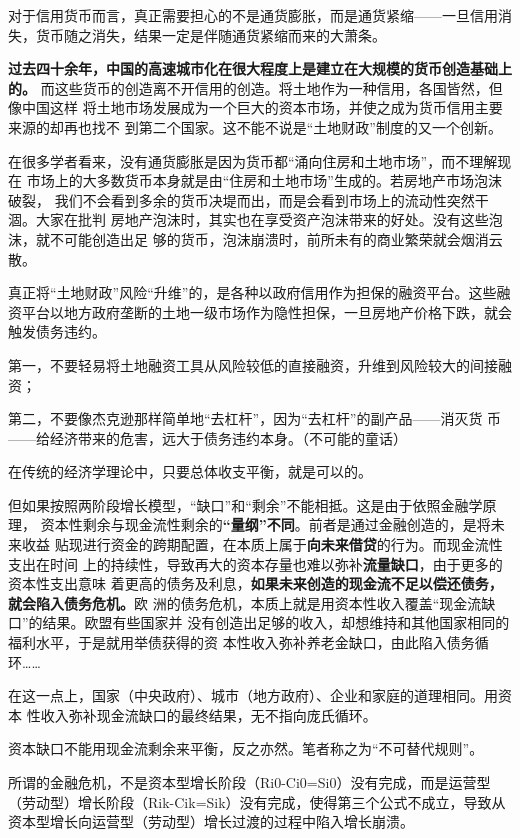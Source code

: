 对于信用货币而言，真正需要担心的不是通货膨胀，而是通货紧缩——一旦信用消失，货币随之消失，结果一定是伴随通货紧缩而来的大萧条。

\textbf{过去四十余年，中国的高速城市化在很大程度上是建立在大规模的货币创造基础上的。}
而这些货币的创造离不开信用的创造。将土地作为一种信用，各国皆然，但像中国这样
将土地市场发展成为一个巨大的资本市场，并使之成为货币信用主要来源的却再也找不
到第二个国家。这不能不说是“土地财政”制度的又一个创新。

在很多学者看来，没有通货膨胀是因为货币都“涌向住房和土地市场”，而不理解现在
市场上的大多数货币本身就是由“住房和土地市场”生成的。若房地产市场泡沫破裂，
我们不会看到多余的货币决堤而出，而是会看到市场上的流动性突然干涸。大家在批判
房地产泡沫时，其实也在享受资产泡沫带来的好处。没有这些泡沫，就不可能创造出足
够的货币，泡沫崩溃时，前所未有的商业繁荣就会烟消云散。


真正将“土地财政”风险“升维”的，是各种以政府信用作为担保的融资平台。这些融资平台以地方政府垄断的土地一级市场作为隐性担保，一旦房地产价格下跌，就会触发债务违约。

第一，不要轻易将土地融资工具从风险较低的直接融资，升维到风险较大的间接融资；

第二，不要像杰克逊那样简单地“去杠杆”，因为“去杠杆”的副产品——消灭货
币——给经济带来的危害，远大于债务违约本身。（不可能的童话）

在传统的经济学理论中，只要总体收支平衡，就是可以的。

但如果按照两阶段增长模型，“缺口”和“剩余”不能相抵。这是由于依照金融学原理，
资本性剩余与现金流性剩余的\textbf{“量纲”不同}。前者是通过金融创造的，是将未来收益
贴现进行资金的跨期配置，在本质上属于\textbf{向未来借贷}的行为。而现金流性支出在时间
上的持续性，导致再大的资本存量也难以弥补\textbf{流量缺口}，由于更多的资本性支出意味
着更高的债务及利息，\textbf{如果未来创造的现金流不足以偿还债务，就会陷入债务危机。}欧
洲的债务危机，本质上就是用资本性收入覆盖“现金流缺口”的结果。欧盟有些国家并
没有创造出足够的收入，却想维持和其他国家相同的福利水平，于是就用举债获得的资
本性收入弥补养老金缺口，由此陷入债务循环……


在这一点上，国家（中央政府）、城市（地方政府）、企业和家庭的道理相同。用资本
性收入弥补现金流缺口的最终结果，无不指向庞氏循环。

资本缺口不能用现金流剩余来平衡，反之亦然。笔者称之为“不可替代规则”。

所谓的金融危机，不是资本型增长阶段（Ri0-Ci0=Si0）没有完成，而是运营型（劳动型）增长阶段（Rik-Cik=Sik）没有完成，使得第三个公式不成立，导致从资本型增长向运营型（劳动型）增长过渡的过程中陷入增长崩溃。

